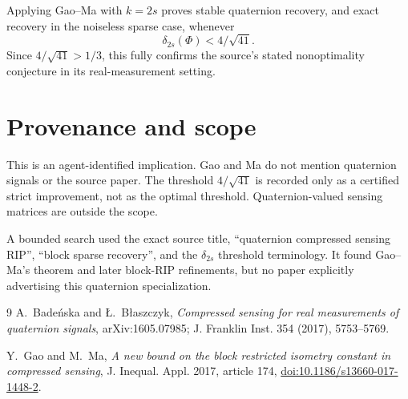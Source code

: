 \documentclass[11pt]{article}
\begin{document}
Applying Gao--Ma with $k=2s$ proves stable quaternion recovery, and exact
recovery in the noiseless sparse case, whenever
\[
 \boxed{\delta_{2s}(\Phi)<4/\sqrt{41}}.
\]
Since $4/\sqrt{41}>1/3$, this fully confirms the source's stated
nonoptimality conjecture in its real-measurement setting.

\section*{Provenance and scope}

This is an agent-identified implication. Gao and Ma do not mention quaternion
signals or the source paper. The threshold $4/\sqrt{41}$ is recorded only as
a certified strict improvement, not as the optimal threshold. Quaternion-valued
sensing matrices are outside the scope.

A bounded search used the exact source title, ``quaternion compressed sensing
RIP'', ``block sparse recovery'', and the $\delta_{2s}$ threshold terminology.
It found Gao--Ma's theorem and later block-RIP refinements, but no paper
explicitly advertising this quaternion specialization.

\begin{thebibliography}{9}
A.~Bade\'nska and \L.~B\l aszczyk,
\emph{Compressed sensing for real measurements of quaternion signals},
arXiv:1605.07985; J. Franklin Inst. 354 (2017), 5753--5769.

Y.~Gao and M.~Ma,
\emph{A new bound on the block restricted isometry constant in compressed sensing},
J. Inequal. Appl. 2017, article 174,
\href{https://doi.org/10.1186/s13660-017-1448-2}{doi:10.1186/s13660-017-1448-2}.
\end{thebibliography}
\end{document}
